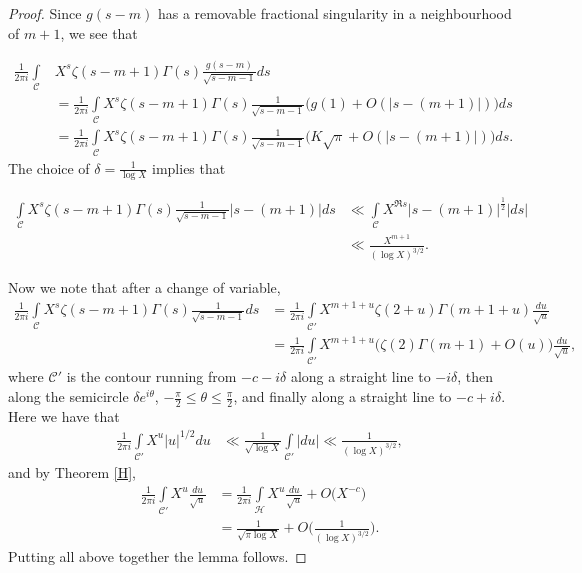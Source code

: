 \documentclass[12pt,reqno]{amsart}
\begin{document}
\begin{proof}
Since $g(s-m)$ has a removable fractional singularity in a neighbourhood of $m+1$, we see that

\begin{align*}
         \frac{1}{2\pi i} \int\limits_{\mathcal{C}} & X^s\zeta(s-m+1)\Gamma(s) \frac{g(s-m)}{\sqrt{s-m-1}} ds \\
         &=  \frac{1}{2\pi i} \int\limits_{\mathcal{C}} X^s\zeta(s-m+1)\Gamma(s) \frac{1}{\sqrt{s-m-1}}\Big(g(1)+O(|s-(m+1)|)\Big) ds\\
    &=  \frac{1}{2\pi i} \int\limits_{\mathcal{C}} X^s\zeta(s-m+1)\Gamma(s) \frac{1}{\sqrt{s-m-1}}\Big(K\sqrt{\pi}+O(|s-(m+1)|)\Big) ds.
\end{align*}
The choice of $\delta=\frac{1}{\log X}$ implies that 

\begin{align*}
   \int\limits_{\mathcal{C}} X^s\zeta(s-m+1)\Gamma(s) \frac{1}{\sqrt{s-m-1}}|s-(m+1)| ds& \ll \int\limits_{\mathcal{C}} X^{\Re s} |s-(m+1)|^{\frac{1}{2}} |ds|\\
   & \ll \frac{X^{m+1}}{(\log X)^{3/2}}.
\end{align*}

Now we note that after a change of variable,
\begin{align*}
    \frac{1}{2\pi i} \int\limits_{\mathcal{C}} X^s\zeta(s-m+1)\Gamma(s) \frac{1}{\sqrt{s-m-1}} ds &= \frac{1}{2\pi i} \int\limits_{\mathcal{C'}} X^{m+1+u}\zeta(2+u)\Gamma(m+1+u) \frac{du}{\sqrt{u}} \\
    & =  \frac{1}{2\pi i} \int\limits_{\mathcal{C'}} X^{m+1+u}\Big(\zeta(2)\Gamma(m+1)+O(u) \Big) \frac{du}{\sqrt{u}},
\end{align*}
where $\mathcal{C'}$ is the contour running from $-c-i\delta$ along a straight line to $-i\delta$, then along the semicircle $\delta e^{i\theta}$, $-\frac{\pi}{2}\leq \theta \leq \frac{\pi}{2}$, and finally along a straight line to $-c+i\delta$. Here we have that 
\begin{align*}
    \frac{1}{2\pi i} \int\limits_{\mathcal{C'}}X^u|u|^{1/2}du&\ll \frac{1}{\sqrt{\log X}} \int\limits_{\mathcal{C'}} |du| \ll \frac{1}{(\log X)^{3/2}},
\end{align*}
and by Theorem \ref{H},
\begin{align*}
    \frac{1}{2\pi i} \int\limits_{\mathcal{C'}}X^u\frac{du}{\sqrt{u}} &=\frac{1}{2\pi i} \int\limits_{\mathcal{H}}X^u \frac{du}{\sqrt{u}}  +O\Big(X^{-c}\Big)\\
    & = \frac{1}{\sqrt{\pi \log X}} +O\Big(\frac{1}{(\log X)^{3/2}}\Big).
\end{align*}
Putting all above together the lemma follows.


\end{proof}
\end{document}
